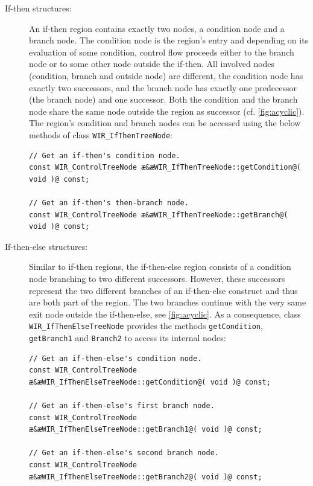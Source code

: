 \begin{description}
  \item[If-then structures:] An if-then region contains exactly two nodes, a condition node and a branch node.
  The condition node is the region's entry and depending on its evaluation of some condition, control flow proceeds either to the branch node or to some other node outside the if-then.
  All involved nodes (condition, branch and outside node) are different, the condition node has exactly two successors, and the branch node has exactly one predecessor (the branch node) and one successor.
  Both the condition and the branch node share the same node outside the region as successor (cf. \cref{fig:acyclic}).
  The region's condition and branch nodes can be accessed using the below methods of class \texttt{WIR\_IfThenTreeNode}:
\begin{lstlisting}[style=code,float=!h,xleftmargin=10mm]
// Get an if-then's condition node.
const WIR_ControlTreeNode æ&æWIR_IfThenTreeNode::getCondition@( void )@ const;

// Get an if-then's then-branch node.
const WIR_ControlTreeNode æ&æWIR_IfThenTreeNode::getBranch@( void )@ const;
\end{lstlisting}

  \item[If-then-else structures:] Similar to if-then regions, the if-then-else region consists of a condition node branching to two different successors.
  However, these successors represent the two different branches of an if-then-else construct and thus are both part of the region.
  The two branches continue with the very same exit node outside the if-then-else, see \cref{fig:acyclic}.
  As a consequence, class \texttt{WIR\_IfThenElseTreeNode} provides the methods \texttt{getCondition}, \texttt{getBranch1} and \texttt{Branch2} to access its internal nodes:
\begin{lstlisting}[style=code,float=!ht,xleftmargin=10mm]
// Get an if-then-else's condition node.
const WIR_ControlTreeNode æ&æWIR_IfThenElseTreeNode::getCondition@( void )@ const;

// Get an if-then-else's first branch node.
const WIR_ControlTreeNode æ&æWIR_IfThenElseTreeNode::getBranch1@( void )@ const;

// Get an if-then-else's second branch node.
const WIR_ControlTreeNode æ&æWIR_IfThenElseTreeNode::getBranch2@( void )@ const;
\end{lstlisting}


\end{description}
